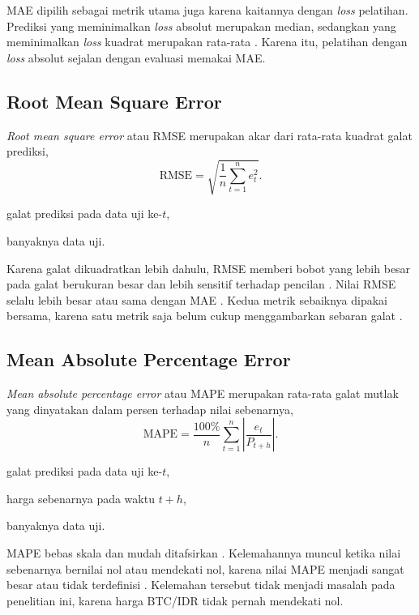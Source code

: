 MAE dipilih sebagai metrik utama juga karena kaitannya dengan \textit{loss}
pelatihan. Prediksi yang meminimalkan \textit{loss} absolut merupakan median,
sedangkan yang meminimalkan \textit{loss} kuadrat merupakan rata-rata
\cite{gneiting2011}. Karena itu, pelatihan dengan \textit{loss} absolut sejalan
dengan evaluasi memakai MAE.

\subsection{Root Mean Square Error}
\textit{Root mean square error} atau RMSE merupakan akar dari rata-rata kuadrat
galat prediksi,
\begin{equation}
  \text{RMSE} = \sqrt{\frac{1}{n}\sum_{t=1}^{n} e_t^2 } .
  \label{eq:rmse}
\end{equation}
\begin{keterangan}
  \item[$e_t$] galat prediksi pada data uji ke-$t$,
  \item[$n$] banyaknya data uji.
\end{keterangan}
Karena galat dikuadratkan lebih dahulu, RMSE memberi bobot yang lebih besar
pada galat berukuran besar dan lebih sensitif terhadap pencilan
\cite{chai2014}. Nilai RMSE selalu lebih besar atau sama dengan MAE
\cite{willmott2005}. Kedua metrik sebaiknya dipakai bersama, karena satu metrik saja belum cukup menggambarkan sebaran galat \cite{chai2014}.

\subsection{Mean Absolute Percentage Error}
\textit{Mean absolute percentage error} atau MAPE merupakan rata-rata galat
mutlak yang dinyatakan dalam persen terhadap nilai sebenarnya,
\begin{equation}
  \text{MAPE} = \frac{100\%}{n}\sum_{t=1}^{n}
  \left\lvert \frac{e_t}{P_{t+h}} \right\rvert .
  \label{eq:mape}
\end{equation}
\begin{keterangan}
  \item[$e_t$] galat prediksi pada data uji ke-$t$,
  \item[$P_{t+h}$] harga sebenarnya pada waktu $t+h$,
  \item[$n$] banyaknya data uji.
\end{keterangan}
MAPE bebas skala dan mudah ditafsirkan \cite{kim2016}. Kelemahannya muncul
ketika nilai sebenarnya bernilai nol atau mendekati nol, karena nilai MAPE
menjadi sangat besar atau tidak terdefinisi \cite{hyndman2006}. Kelemahan
tersebut tidak menjadi masalah pada penelitian ini, karena harga BTC/IDR tidak
pernah mendekati nol.


